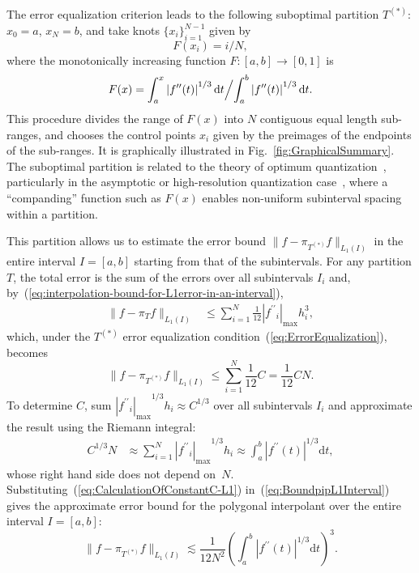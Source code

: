 \documentclass[a4paper,english]{IEEEtran}
\begin{document}
The error equalization criterion leads to the following suboptimal
partition ${{T}^{(\ast)}}$: $x_{0}=a$, $x_{N}=b$, and take knots
$\{x_{i}\}_{i=1}^{N-1}$ given by 
\begin{equation}
F(x_{i})=i/N,\label{eq:optimized-partition}
\end{equation}
where the monotonically increasing function $F:[a,b]\to[0,1]$ is
\begin{equation}
F(x)=\int_{a}^{x}\left|{{f}^{\prime\prime}}(t)\right|^{1/3}\mathrm{d}t\Bigl/\int_{a}^{b}\left|{{f}^{\prime\prime}}(t)\right|^{1/3}\mathrm{d}t.\label{eq:cumulative-knot-distribution}
\end{equation}
This procedure divides the range of $F(x)$ into $N$ contiguous equal
length sub-ranges, and chooses the control points $x_{i}$ given by
the preimages of the endpoints of the sub-ranges. It is graphically
illustrated in Fig.~\ref{fig:GraphicalSummary}. The suboptimal partition
is related to the theory of optimum quantization~\cite{Gersho1978},
particularly in the asymptotic or high-resolution quantization case~\cite{Lookabaugh1989},
where a ``companding'' function such as $F(x)$ enables non-uniform
subinterval spacing within a partition.

This partition allows us to estimate the error bound $\|{f}-{\pi_{{T}^{(\ast)}}}{f}\|_{{L_{1}}(I)}$
in the entire interval $I=[a,b]$ starting from that of the subintervals.
For any partition ${T}$, the total error is the sum of the errors
over all subintervals $I_{i}$ and, by~(\ref{eq:interpolation-bound-for-L1error-in-an-interval}),
\begin{align}
\|{f}-{\pi_{T}}{f}\|_{{L_{1}}(I)} & \leq\sum_{i=1}^{N}\frac{1}{12}{|{{f}^{\prime\prime}}_{i}|_{\max}} h_{i}^{3},\label{eq:BoundpipL1-prev}
\end{align}
which, under the ${{T}^{(\ast)}}$ error equalization condition~(\ref{eq:ErrorEqualization}),
becomes 
\begin{equation}
\|{f}-{\pi_{{T}^{(\ast)}}}{f}\|_{{L_{1}}(I)}\leq\sum_{i=1}^{N}\frac{1}{12}C=\frac{1}{12}CN.\label{eq:BoundpipL1Interval}
\end{equation}
To determine $C$, sum ${|{{f}^{\prime\prime}}_{i}|_{\max}}^{1/3}h_{i}\approx C^{1/3}$ over all
subintervals $I_{i}$ and approximate the result using the Riemann
integral: 
\begin{align}
C^{1/3}N & \approx\sum_{i=1}^{N}{|{{f}^{\prime\prime}}_{i}|_{\max}}^{1/3}h_{i}\approx\int_{a}^{b}\left|{{f}^{\prime\prime}}(t)\right|^{1/3}\mathrm{d}t,\label{eq:CalculationOfConstantC-L1}
\end{align}
whose right hand side does not depend on~$N$. Substituting~(\ref{eq:CalculationOfConstantC-L1})
in~(\ref{eq:BoundpipL1Interval}) gives the approximate error bound
for the polygonal interpolant over the entire interval $I=[a,b]$:
\begin{equation}
\|{f}-{\pi_{{T}^{(\ast)}}}{f}\|_{{L_{1}}(I)}\lesssim\frac{1}{12N^{2}}\left(\int_{a}^{b}\left|{{f}^{\prime\prime}}(t)\right|^{1/3}\mathrm{d}t\right)^{3}.\label{eq:ApproxL1Boundpip}
\end{equation}
\end{document}
